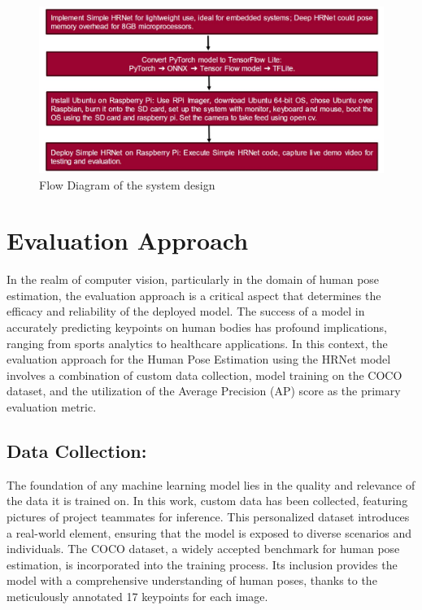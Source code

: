 \documentclass{article}
\begin{document}
\begin{figure}
  \centering
  \includegraphics[width=\textwidth]{flow_chart.jpg}
  \caption{Flow Diagram of the system design}
  \label{fig2}
\end{figure}




\section{\fontsize{12}{14}\selectfont Evaluation Approach}

In the realm of computer vision, particularly in the domain of human pose estimation, the evaluation approach is a critical aspect that determines the efficacy and reliability of the deployed model. The success of a model in accurately predicting keypoints on human bodies has profound implications, ranging from sports analytics to healthcare applications. In this context, the evaluation approach for the Human Pose Estimation using the HRNet model involves a combination of custom data collection, model training on the COCO dataset, and the utilization of the  Average Precision (AP) score as the primary evaluation metric.

\subsection{Data Collection:}
The foundation of any machine learning model lies in the quality and relevance of the data it is trained on. In this work, custom data has been collected, featuring pictures of project teammates for inference. This personalized dataset introduces a real-world element, ensuring that the model is exposed to diverse scenarios and individuals. The COCO dataset, a widely accepted benchmark for human pose estimation, is incorporated into the training process. Its inclusion provides the model with a comprehensive understanding of human poses, thanks to the meticulously annotated 17 keypoints for each image.
\end{document}
